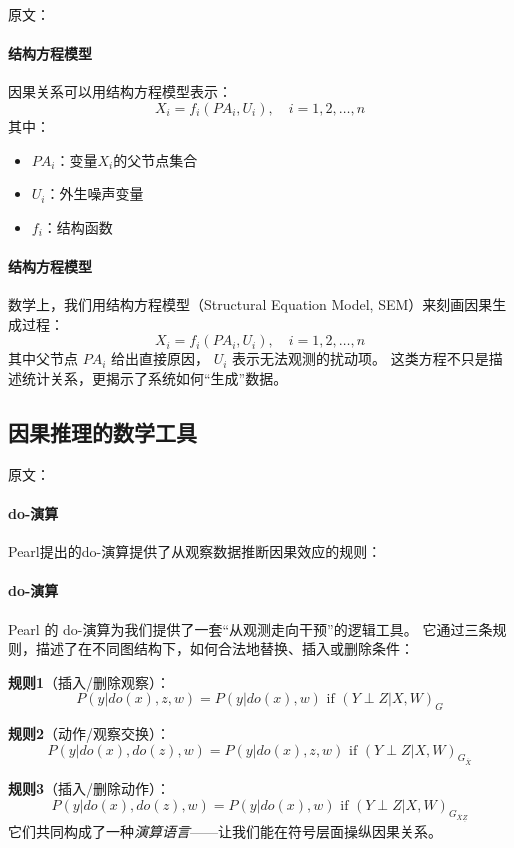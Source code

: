 原文：
\paragraph{结构方程模型}
因果关系可以用结构方程模型表示：
$$X_i = f_i(PA_i, U_i), \quad i = 1, 2, \ldots, n$$
其中：
\begin{itemize}
\item $PA_i$：变量$X_i$的父节点集合
\item $U_i$：外生噪声变量
\item $f_i$：结构函数
\end{itemize}
\paragraph{结构方程模型}
数学上，我们用结构方程模型（Structural Equation Model, SEM）来刻画因果生成过程：
$$X_i = f_i(PA_i, U_i), \quad i = 1, 2, \ldots, n$$
其中父节点 $PA_i$ 给出直接原因， $U_i$ 表示无法观测的扰动项。  
这类方程不只是描述统计关系，更揭示了系统如何“生成”数据。

\subsection{因果推理的数学工具}

原文：
\paragraph{do-演算}
Pearl提出的do-演算提供了从观察数据推断因果效应的规则：
\paragraph{do-演算}
Pearl 的 do-演算为我们提供了一套“从观测走向干预”的逻辑工具。  
它通过三条规则，描述了在不同图结构下，如何合法地替换、插入或删除条件：

\textbf{规则1}（插入/删除观察）：
$$P(y|do(x), z, w) = P(y|do(x), w) \text{ if } (Y \perp Z | X, W)_G$$

\textbf{规则2}（动作/观察交换）：
$$P(y|do(x), do(z), w) = P(y|do(x), z, w) \text{ if } (Y \perp Z | X, W)_{G_{\overline{X}}}$$

\textbf{规则3}（插入/删除动作）：
$$P(y|do(x), do(z), w) = P(y|do(x), w) \text{ if } (Y \perp Z | X, W)_{G_{\overline{X}\underline{Z}}}$$
它们共同构成了一种\emph{演算语言}——让我们能在符号层面操纵因果关系。

